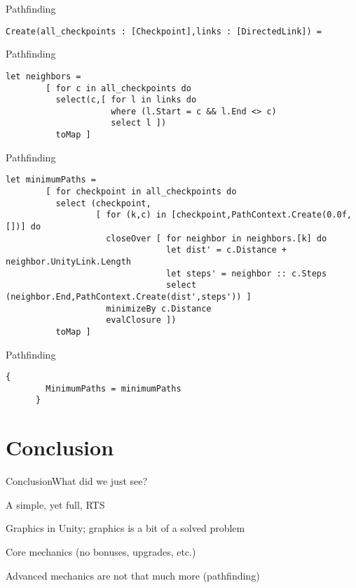 \documentclass{beamer}
\begin{document}
\begin{frame}[fragile]{Pathfinding}
\begin{lstlisting}[frame=shadowbox]
    Create(all_checkpoints : [Checkpoint],links : [DirectedLink]) =
\end{lstlisting}
\end{frame}

\begin{frame}[fragile]{Pathfinding}
\begin{lstlisting}[frame=shadowbox]
      let neighbors =
        [ for c in all_checkpoints do
          select(c,[ for l in links do
                     where (l.Start = c && l.End <> c)
                     select l ])
          toMap ]
\end{lstlisting}
\end{frame}

\begin{frame}[fragile]{Pathfinding}
\begin{lstlisting}[frame=shadowbox]
      let minimumPaths =
        [ for checkpoint in all_checkpoints do
          select (checkpoint,
                  [ for (k,c) in [checkpoint,PathContext.Create(0.0f,[])] do
                    closeOver [ for neighbor in neighbors.[k] do
                                let dist' = c.Distance + neighbor.UnityLink.Length
                                let steps' = neighbor :: c.Steps
                                select (neighbor.End,PathContext.Create(dist',steps')) ]
                    minimizeBy c.Distance
                    evalClosure ])
          toMap ]
\end{lstlisting}
\end{frame}

\begin{frame}[fragile]{Pathfinding}
\begin{lstlisting}[frame=shadowbox]
      {
        MinimumPaths = minimumPaths
      }
\end{lstlisting}
\end{frame}

\section{Conclusion}
\begin{slide}{Conclusion}{What did we just see?}{
\item A simple, yet full, RTS
\item Graphics in Unity; graphics is a bit of a solved problem
\item Core mechanics (no bonuses, upgrades, etc.)
\item Advanced mechanics are not that much more (pathfinding)
}\end{slide}
\end{document}
